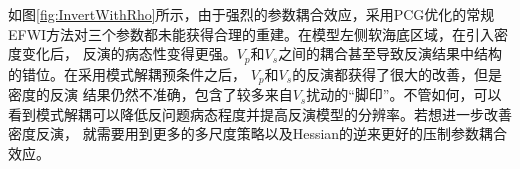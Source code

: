 如图\ref{fig:InvertWithRho}所示，由于强烈的参数耦合效应，采用PCG优化的常规EFWI方法对三个参数都未能获得合理的重建。在模型左侧软海底区域，在引入密度变化后，
反演的病态性变得更强。$V_p$和$V_s$之间的耦合甚至导致反演结果中结构的错位。在采用模式解耦预条件之后， $V_p$和$V_s$的反演都获得了很大的改善，但是密度的反演
结果仍然不准确，包含了较多来自$V_s$扰动的“脚印”。不管如何，可以看到模式解耦可以降低反问题病态程度并提高反演模型的分辨率。若想进一步改善密度反演，
就需要用到更多的多尺度策略以及Hessian的逆来更好的压制参数耦合效应。
\begin{figure}
    \begin{center}
        \\
        \\

\end{center}
\end{figure}

